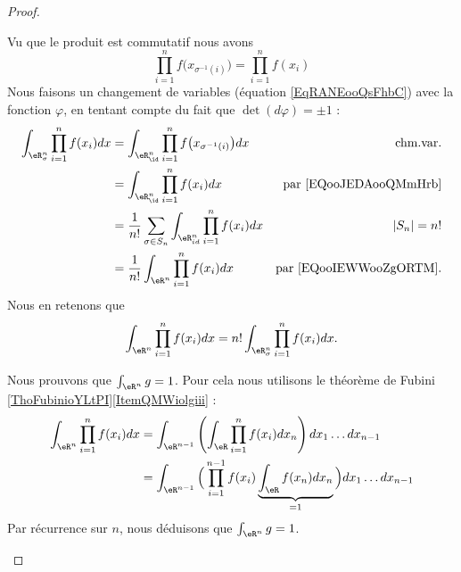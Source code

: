 \begin{proof}
\begin{subproof}
		Vu que le produit est commutatif nous avons
		\begin{equation}		\label{EQooJEDAooQMmHrb}
			\prod_{i=1}^nf\big( x_{\sigma^{-1}(i)} \big)=\prod_{i=1}^nf(x_i)
		\end{equation}
		Nous faisons un changement de variables (équation \ref{EqRANEooQsFhbC}) avec la fonction \( \varphi\), en tentant compte du fait que \( \det(d\varphi)=\pm 1\) :
		\begin{subequations}
			\begin{align}
				\int_{\eR^n_{\sigma}}\prod_{i=1}^nf(x_i)dx & = \int_{\eR^n_{\id}}\prod_{i=1}^nf\big( x_{\sigma^{-1}(i)} \big)dx         & \text{chm.var.}                      \\
				                                           & =    \int_{\eR^n_{\id}}\prod_{i=1}^nf(x_i)dx                               & \text{par \eqref{EQooJEDAooQMmHrb}}  \\
				                                           & =\frac{1}{ n!}\sum_{\sigma\in S_{n}}\int_{\eR^n_{id}}\prod_{i=1}^nf(x_i)dx & | S_n |=n!                           \\
				                                           & =\frac{1}{ n!}\int_{\eR^n}\prod_{i=1}^nf(x_i)dx                            & \text{par \eqref{EQooIEWWooZgORTM}.}
			\end{align}
		\end{subequations}
		Nous en retenons que
		\begin{equation}
			\int_{\eR^n}\prod_{i=1}^nf(x_i)dx=n!\int_{\eR^n_{\sigma}}\prod_{i=1}^nf(x_i)dx.
		\end{equation}

		\spitem[Intégrale \( 1\)]
		Nous prouvons que \( \int_{\eR^n}g=1\). Pour cela nous utilisons le théorème de Fubini \ref{ThoFubinioYLtPI}\ref{ItemQMWiolgiii} :
		\begin{subequations}
			\begin{align}
				\int_{\eR^n}\prod_{i=1}^nf(x_i)dx & =\int_{\eR^{n-1}}\left(   \int_{\eR}\prod_{i=1}^nf(x_i)dx_n  \right)dx_1\ldots dx_{n-1}                         \\
				                                  & =\int_{\eR^{n-1}}\Big(  \prod_{i=1}^{n-1}f(x_i)\underbrace{\int_{\eR}f(x_n)dx_n}_{=1}  \Big)dx_1\ldots dx_{n-1}
			\end{align}
		\end{subequations}
		Par récurrence sur \( n\), nous déduisons que \( \int_{\eR^n}g=1\).
	\end{subproof}

\end{proof}

